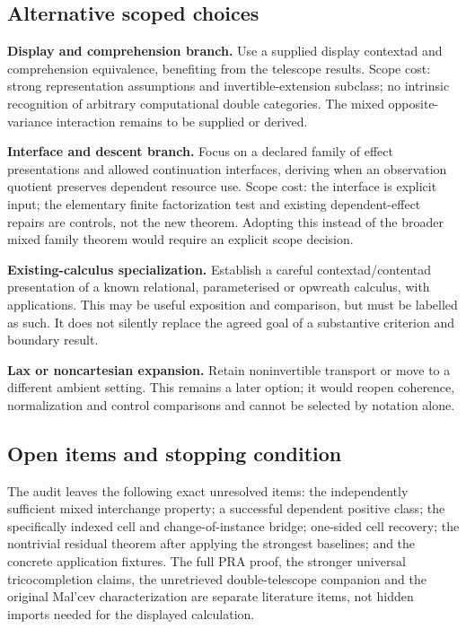 \documentclass[11pt,a4paper]{article}
\begin{document}
\subsection{Alternative scoped choices}

\textbf{Display and comprehension branch.} Use a supplied display contextad and
comprehension equivalence, benefiting from the telescope results. Scope cost:
strong representation assumptions and invertible-extension subclass; no intrinsic
recognition of arbitrary computational double categories. The mixed opposite-
variance interaction remains to be supplied or derived.

\textbf{Interface and descent branch.} Focus on a declared family of effect
presentations and allowed continuation interfaces, deriving when an observation
quotient preserves dependent resource use. Scope cost: the interface is explicit
input; the elementary finite factorization test and existing dependent-effect
repairs are controls, not the new theorem. Adopting this instead of the broader
mixed family theorem would require an explicit scope decision.

\textbf{Existing-calculus specialization.} Establish a careful contextad/contentad
presentation of a known relational, parameterised or opwreath calculus, with
applications. This may be useful exposition and comparison, but must be labelled
as such. It does not silently replace the agreed goal of a substantive criterion
and boundary result.

\textbf{Lax or noncartesian expansion.} Retain noninvertible transport or move to a
different ambient setting. This remains a later option; it would reopen coherence,
normalization and control comparisons and cannot be selected by notation alone.

\subsection{Open items and stopping condition}

The audit leaves the following exact unresolved items: the independently
sufficient mixed interchange property; a successful dependent positive class;
the specifically indexed cell and change-of-instance bridge; one-sided cell recovery;
the nontrivial residual theorem after applying the strongest baselines; and the
concrete application fixtures. The full PRA proof, the stronger universal
tricocompletion claims, the unretrieved double-telescope companion and the
original Mal'cev characterization are separate literature items, not hidden
imports needed for the displayed calculation.
\end{document}
